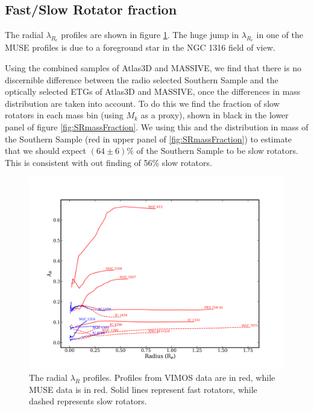 

	\subsection{Fast/Slow Rotator fraction}
		\label{subsec:FSfrac}
		The radial $\lambda_{R_e}$ profiles are shown in figure \ref{fig:lambdaR_profile}. The huge jump in $\lambda_{R_e}$ in one of the MUSE profiles is due to a foreground star in the NGC 1316 field of view. 

		Using the combined samples of Atlas3D and MASSIVE, we find that there is no discernible difference between the radio selected Southern Sample and the optically selected ETGs of Atlas3D and MASSIVE, once the differences in mass distribution are taken into account. To do this we find the fraction of slow rotators in each mass bin (using $M_k$ as a proxy), shown in black in the lower panel of figure \ref{fig:SRmassFraction}. We using this and the distribution in mass of the Southern Sample (red in upper panel of \ref{fig:SRmassFraction}) to estimate that we should expect $(64 \pm 6)\%$ of the Southern Sample to be slow rotators. This is consistent with out finding of 56\% slow rotators.

		\begin{figure}
			\centering
			\includegraphics[width=\textwidth]{chapter4/lambda_R.png}
			\caption[$\lambda_{R}$ radial profiles]{The radial $\lambda_{R}$ profiles. Profiles from VIMOS data are in red, while MUSE data is in red. Solid lines represent fast rotators, while dashed represents slow rotators.}
			\label{fig:lambdaR_profile}
		\end{figure}


